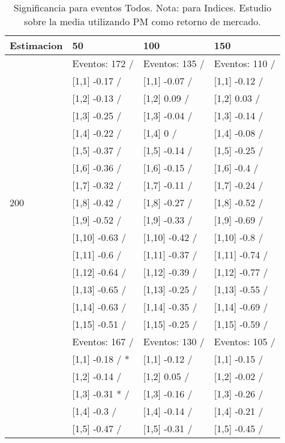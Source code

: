\begin{table}

\caption{Significancia para eventos Todos. Nota: para Indices. Estudio sobre la media utilizando PM como retorno de mercado.}
\centering
\begin{tabular}[t]{llll}
\toprule
Estimacion & 50 & 100 & 150\\
\midrule
 & Eventos:  172 / & Eventos:  135 / & Eventos:  110 /\\
 & {}[1,1] -0.17  / & {}[1,1] -0.07  / & {}[1,1] -0.12  /\\
 & {}[1,2] -0.13  / & {}[1,2] 0.09  / & {}[1,2] 0.03  /\\
 & {}[1,3] -0.25  / & {}[1,3] -0.04  / & {}[1,3] -0.14  /\\
 & {}[1,4] -0.22  / & {}[1,4] 0  / & {}[1,4] -0.08  /\\
\addlinespace
 & {}[1,5] -0.37  / & {}[1,5] -0.14  / & {}[1,5] -0.25  /\\
 & {}[1,6] -0.36  / & {}[1,6] -0.15  / & {}[1,6] -0.4  /\\
 & {}[1,7] -0.32  / & {}[1,7] -0.11  / & {}[1,7] -0.24  /\\
200 & {}[1,8] -0.42  / & {}[1,8] -0.27  / & {}[1,8] -0.52  /\\
 & {}[1,9] -0.52  / & {}[1,9] -0.33  / & {}[1,9] -0.69  /\\
\addlinespace
 & {}[1,10] -0.63  / & {}[1,10] -0.42  / & {}[1,10] -0.8  /\\
 & {}[1,11] -0.6  / & {}[1,11] -0.37  / & {}[1,11] -0.74  /\\
 & {}[1,12] -0.64  / & {}[1,12] -0.39  / & {}[1,12] -0.77  /\\
 & {}[1,13] -0.65  / & {}[1,13] -0.25  / & {}[1,13] -0.55  /\\
 & {}[1,14] -0.63  / & {}[1,14] -0.35  / & {}[1,14] -0.69  /\\
\addlinespace
 & {}[1,15] -0.51  / & {}[1,15] -0.25  / & {}[1,15] -0.59  /\\
 & Eventos:  167 / & Eventos:  130 / & Eventos:  105 /\\
 & {}[1,1] -0.18  / * & {}[1,1] -0.12  / & {}[1,1] -0.15  /\\
 & {}[1,2] -0.14  / & {}[1,2] 0.05  / & {}[1,2] -0.02  /\\
 & {}[1,3] -0.31 * / & {}[1,3] -0.16  / & {}[1,3] -0.26  /\\
\addlinespace
 & {}[1,4] -0.3  / & {}[1,4] -0.14  / & {}[1,4] -0.21  /\\
 & {}[1,5] -0.47  / & {}[1,5] -0.31  / & {}[1,5] -0.45  /\\

\end{tabular}
\end{table}
